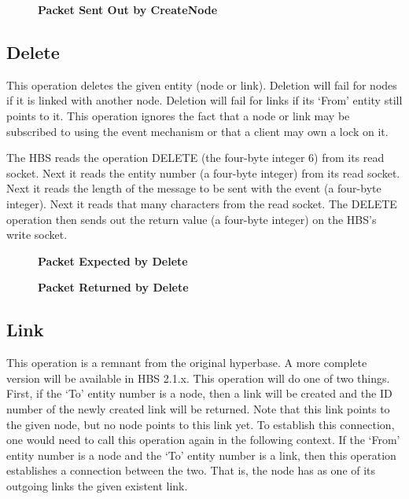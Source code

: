 \begin{figure}[htb]
  \centerline{}
  \caption{{\bf Packet Sent Out by CreateNode}}
  \label{fig:CreateNode2}
\end{figure}

\newpage
\subsection{Delete}

This operation deletes the given entity (node or link).  Deletion will fail
for nodes if it is linked with another node.  Deletion will fail for links
if its `From' entity still points to it.  This operation ignores the fact that a
node or link may be subscribed to using the event mechanism or that a client
may own a lock on it.  

The HBS reads the operation DELETE (the four-byte integer 6) from its read
socket.  Next it reads the entity number (a four-byte integer) from its
read socket.  Next it reads the length of the message to be sent with
the event (a four-byte integer).  Next it reads that many characters from
the read socket.  The DELETE operation then sends out the return value
(a four-byte integer) on the HBS's write socket.

\begin{figure}[htb]
  \centerline{}
  \caption{{\bf Packet Expected by Delete}}
  \label{fig:Delete1}
\end{figure}

\begin{figure}[htb]
  \centerline{}
  \caption{{\bf Packet Returned by Delete}}
  \label{fig:Delete2}
\end{figure}

\newpage
\subsection{Link}

This operation is a remnant from the original hyperbase.  A more complete
version will be available in HBS 2.1.x.  This operation will do one of two
things.  First, if the `To' entity number is a node, then a link will be
created and the ID number of the newly created link will be returned.  Note
that this link points to the given node, but no node points to this link
yet.  To establish this connection, one would need to call this operation
again in the following context.  If the `From' entity number is a node and
the `To' entity number is a link, then this operation establishes a
connection between the two.  That is, the node has as one of its outgoing
links the given existent link.

